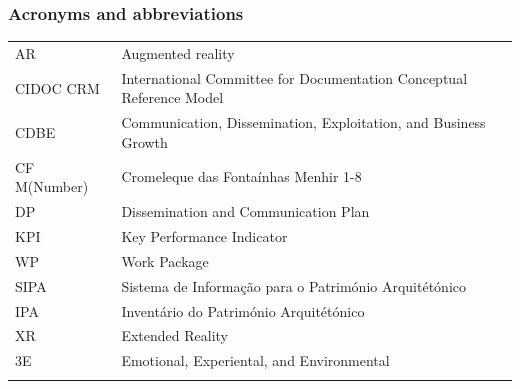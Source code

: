 \documentclass[10pt]{report}
\renewcommand{\arraystretch}{1.3}
\begin{document}
\newpage
{}


\settableofcontents
\tableofcontents

\newpage
{} 
\setcounter{page}{5} 
\listoftables

\newpage
{}
\setcounter{page}{6} 
\listoffigures

\newpage
\subsubsection*{Acronyms and abbreviations}\vspace{-1.5ex}

\def\arraystretch{1}
  \begin{tabular}[t]{!{\color{INT-ACTorange}\vrule}a!{\color{INT-ACTorange}\vrule}l!{\color{INT-ACTorange}\vrule}}
    \hline
    \color{white}
    AR &
    \color{black}
    Augmented reality
    \\\hhline{~-}
    \color{white}
    CIDOC CRM &
    \color{black}
    International Committee for Documentation Conceptual Reference Model 
    \\\hline
    \color{white}
    CDBE &
    \color{black}
    Communication, Dissemination, Exploitation, and Business Growth
    \\\hline
    \color{white}
    CF M(Number) &
    \color{black}
    Cromeleque das Fontaínhas Menhir 1-8
    \\\hline
    \color{white}
    DP &
    \color{black}
    Dissemination and Communication Plan
    \\\hhline{~-}
    \color{white}
    KPI &
    \color{black}
    Key Performance Indicator
    \\\hhline{~-}
    \color{white}
    WP &
    \color{black}
    Work Package
    \\\hhline{~-}
    \color{white}
    SIPA &
    \color{black}
    Sistema de Informação para o Património Arquitétónico
    \\\hline
   \color{white} IPA &
    \color{black}
   Inventário do Património Arquitétónico 
    \\\hline
    \color{white}
    XR &
    \color{black}
    Extended Reality 
    \\\hhline{~-}
    \color{white}
    3E &
    \color{black}
    Emotional, Experiental, and Environmental
    \\\hhline{~-}
\end{tabular}
\end{document}
